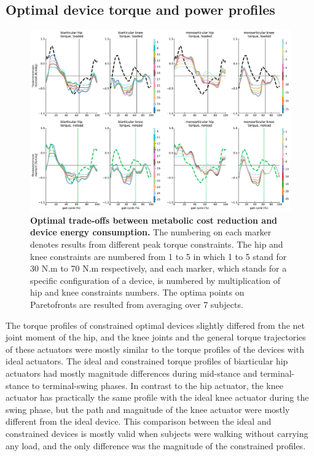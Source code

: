 \documentclass[10pt,letterpaper]{article}
\begin{document}
\subsection*{Optimal device torque and power profiles }
\begin{figure}[ht]   
	\centering
	\includegraphics[width=\linewidth]{Pareto_Simulations_Figures/PaperFigure_Paretofront_TorqueProfiles.pdf}
	\vspace{1mm}
	\caption{{\small\textbf{Optimal trade-offs between metabolic cost reduction and device energy consumption.} The numbering on each marker denotes results from different peak torque constraints. The hip and knee constraints are numbered from 1 to 5 in which 1 to 5 stand for 30 N.m to 70 N.m respectively, and each marker, which stands for a specific configuration of a device, is numbered by multiplication of hip and knee constraints numbers. The optima points on Paretofronts are resulted from averaging over 7 subjects.}}
	\label{Fig_Paretofronts_Torque_Profiles}
\end{figure}
The torque profiles of constrained optimal devices slightly differed from the net joint moment of the hip, and the knee joints and the general torque trajectories of these actuators were mostly similar to the torque profiles of the devices with ideal actuators. The ideal and constrained torque profiles of biarticular hip actuators had mostly magnitude differences during mid-stance and terminal-stance to terminal-swing phases. In contrast to the hip actuator, the knee actuator has practically the same profile with the ideal knee actuator during the swing phase, but the path and magnitude of the knee actuator were mostly different from the ideal device. This comparison between the ideal and constrained devices is mostly valid when subjects were walking without carrying any load, and the only difference was the magnitude of the constrained profiles.\\
\end{document}
